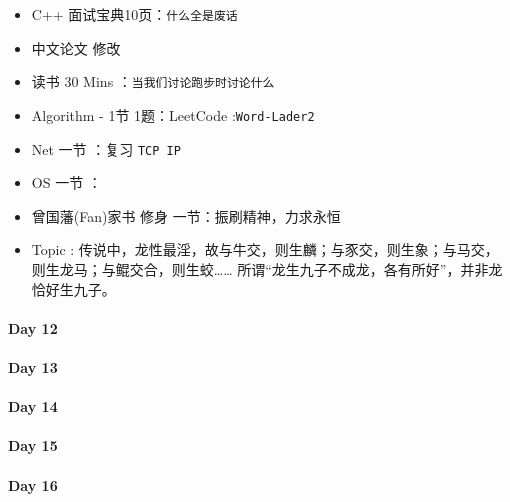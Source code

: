 \documentclass[UTF8,a4paper,8pt]{ctexart}
\begin{document}
	 	 \begin{itemize}[itemindent = 1em]
	 	 	\renewcommand\labelitemi{\makebox[0pt][l]{$\square$}\hspace{1em}} 
	 	 	\renewcommand\labelitemi{\makebox[0pt][l]{$\square$}\raisebox{.15ex}{\hspace{0.1em}$\checkmark$}}	 	
	 	 	\item   C++ 面试宝典10页：\verb|什么全是废话|
	 	 	\item   中文论文 修改
	 	 	
	 	 	\item   读书  30 Mins	：\verb|当我们讨论跑步时讨论什么|
	 	 	\item   Algorithm - 1节 1题：LeetCode :\verb|Word-Lader2|	
	 	 	\item   Net 一节 ：复习 \verb|TCP IP|	
	 	 	\renewcommand\labelitemi{\makebox[0pt][l]{$\square$}\hspace{1em}} 
	 	 	
	 	 	\item   OS  一节 ：
	 	 	
	 	 	\renewcommand\labelitemi{\makebox[0pt][l]{$\square$}\raisebox{.15ex}{\hspace{0.1em}$\checkmark$}}
	 	 	\item   曾国藩(Fan)家书 修身 一节：振刷精神，力求永恒
	 	 	\item   Topic : 传说中，龙性最淫，故与牛交，则生麟；与豕交，则生象；与马交，则生龙马；与鲲交合，则生蛟…… 所谓“龙生九子不成龙，各有所好”，并非龙恰好生九子。
	 	 \end{itemize}
 	 \paragraph{Day 12      \quad     }
 	 \paragraph{Day 13      \quad     }
 	 \paragraph{Day 14      \quad     }
 	 \paragraph{Day 15      \quad     }
 	 \paragraph{Day 16      \quad     }
\end{document}
